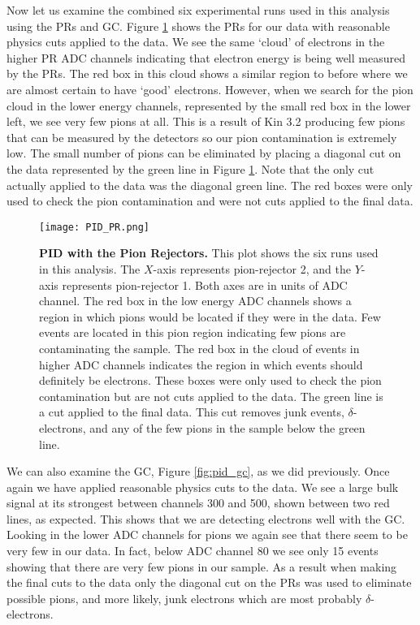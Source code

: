 Now let us examine the combined six experimental runs used in this analysis using the PRs and GC. Figure \ref{fig:pid_pr} shows the PRs for our data with reasonable physics cuts applied to the data. We see the same `cloud' of electrons in the higher PR ADC channels indicating that electron energy is being well measured by the PRs. The red box in this cloud shows a similar region to before where we are almost certain to have `good' electrons. However, when we search for the pion cloud in the lower energy channels, represented by the small red box in the lower left, we see very few pions at all. This is a result of Kin 3.2 producing few pions that can be measured by the detectors so our pion contamination is extremely low. The small number of pions can be eliminated by placing a diagonal cut on the data represented by the green line in Figure \ref{fig:pid_pr}. Note that the only cut actually applied to the data was the diagonal green line. The red boxes were only used to check the pion contamination and were not cuts applied to the final data.

\begin{figure}[!ht]
\begin{center}
\texttt{[image: PID\_PR.png]}
\end{center}
\caption[PID with the Pion Rejectors]{
{\bf{PID with the Pion Rejectors.}} This plot shows the six runs used in this analysis. The $X$-axis represents pion-rejector 2, and the $Y$-axis represents pion-rejector 1. Both axes are in units of ADC channel. The red box in the low energy ADC channels shows a region in which pions would be located if they were in the data. Few events are located in this pion region indicating few pions are contaminating the sample. The red box in the cloud of events in higher ADC channels indicates the region in which events should definitely be electrons. These boxes were only used to check the pion contamination but are not cuts applied to the data. The green line is a cut applied to the final data. This cut removes junk events, $\delta$-electrons, and any of the few pions in the sample below the green line.}
\label{fig:pid_pr}
\end{figure}

We can also examine the GC, Figure \ref{fig:pid_gc}, as we did previously. Once again we have applied reasonable physics cuts to the data. We see a large bulk signal at its strongest between channels 300 and 500, shown between two red lines, as expected. This shows that we are detecting electrons well with the GC. Looking in the lower ADC channels for pions we again see that there seem to be very few in our data. In fact, below ADC channel 80 we see only 15 events showing that there are very few pions in our sample. As a result when making the final cuts to the data only the diagonal cut on the PRs was used to eliminate possible pions, and more likely, junk electrons which are most probably $\delta$-electrons.

